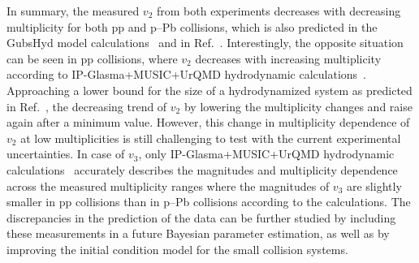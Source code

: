 In summary, the measured $v_{2}$ from both experiments decreases with decreasing multiplicity for both pp and p--Pb collisions, which is also predicted in the GubsHyd model calculations~\cite{Taghavi:2019mqz} and in Ref.~\cite{Weller:2017tsr}. Interestingly, the opposite situation can be seen in pp collisions, where $v_2$ decreases with increasing multiplicity according to IP-Glasma+MUSIC+UrQMD hydrodynamic calculations~\cite{Schenke:2020mbo}. 
Approaching a lower bound for the size of a hydrodynamized
system as predicted in Ref.~\cite{Taghavi:2019mqz}, 
the decreasing trend of $v_2$ by lowering the multiplicity changes and raise again after a minimum value. However, this change in multiplicity dependence of $v_2$ at low multiplicities is still challenging to test with the current experimental uncertainties. In case of $v_3$, only IP-Glasma+MUSIC+UrQMD hydrodynamic calculations~\cite{Schenke:2020mbo} accurately describes the magnitudes and multiplicity dependence across the measured multiplicity ranges where the magnitudes of $v_3$ are slightly smaller in pp collisions than in p--Pb collisions according to the calculations. The discrepancies in the prediction of the data can be further studied by including these measurements in a future Bayesian parameter estimation, as well as by improving the initial condition model for the small collision systems.

